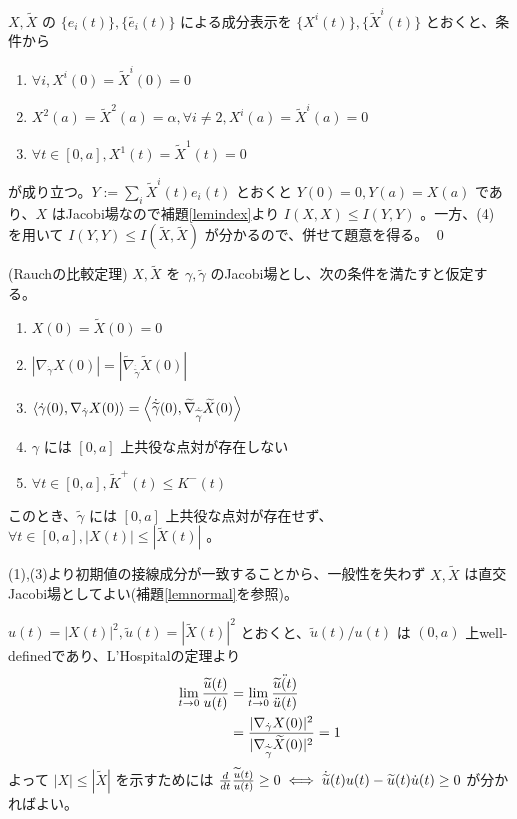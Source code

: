 \documentclass[dvipdfmx,a4paper]{jsreport}
\theoremstyle{definition}
\renewcommand{\tilde}{\widetilde}
\begin{document}
$X,\tilde{X}$ の $\{e_i(t)\},\{\tilde{e_i}(t)\}$ による成分表示を $\{X^i(t)\},\{\tilde{X}^i(t)\}$ とおくと、条件から
\begin{enumerate}
    \item $\forall i,X^i(0)=\tilde{X}^i(0)=0$
    \item $X^2(a)=\tilde{X}^2(a)=\alpha,\forall i \neq 2,X^i(a)=\tilde{X}^i(a)=0$
    \item $\forall t\in [0,a],X^1(t)=\tilde{X}^1(t)=0$ 
\end{enumerate}

が成り立つ。$Y:=\sum_i \tilde{X}^i(t)e_i(t)$ とおくと $Y(0)=0,Y(a)=X(a)$ であり、$X$ はJacobi場なので補題\ref{lemindex}より $I(X,X) \leq I(Y,Y)$ 。一方、(4) を用いて $I(Y,Y) \leq I(\tilde{X},\tilde{X})$ が分かるので、併せて題意を得る。 \qed 

\thm\label{thmrauch} (Rauchの比較定理) $X,\tilde{X}$ を $\gamma,\tilde{\gamma}$ のJacobi場とし、次の条件を満たすと仮定する。
\begin{enumerate}
    \item $X(0)=\tilde{X}(0)=0$
    \item $|\nabla_{\dot{\gamma}} X(0)|=|\tilde{\nabla}_{\dot{\tilde{\gamma}}} \tilde{X}(0)|$
    \item $\ev{\dot{\gamma}(0),\nabla_{\dot{\gamma}}X(0)}=\ev{\dot{\tilde{\gamma}}(0),\tilde{\nabla}_{\dot{\tilde{\gamma}}} \tilde{X}(0)}$
    \item $\gamma$ には $[0,a]$ 上共役な点対が存在しない
    \item $\forall t \in [0,a],\tilde{K}^+(t) \leq K^-(t)$ 
\end{enumerate}

このとき、$\tilde{\gamma}$ には $[0,a]$ 上共役な点対が存在せず、$\forall t\in [0,a],|X(t)|\leq |\tilde{X}(t)|$ 。

\prf (1),(3)より初期値の接線成分が一致することから、一般性を失わず $X,\tilde{X}$ は直交Jacobi場としてよい(補題\ref{lemnormal}を参照)。

$u(t)=|X(t)|^2,\tilde{u}(t)=|\tilde{X}(t)|^2$ とおくと、$\tilde{u}(t)/u(t)$ は $(0,a)$ 上well-definedであり、L'Hospitalの定理より
\begin{align*}
    \lim_{t \to 0}{{\tilde{u}(t)} \over {u}(t)} &= \lim_{t \to 0} {\ddot{\tilde{u}(t)} \over \ddot{u}(t)} \\
    &= {|\nabla_{\dot{\gamma}}X(0)|^2 \over |\nabla_{\dot{\tilde{\gamma}}}\tilde{X}(0)|^2}=1
\end{align*}
よって $|X| \leq |\tilde{X}|$ を示すためには ${d \over dt}{\tilde{u}(t) \over u(t)} \geq 0 \iff \dot{\tilde{u}}(t)u(t)-\tilde{u}(t)\dot{u}(t) \geq 0$ が分かればよい。
\end{document}
